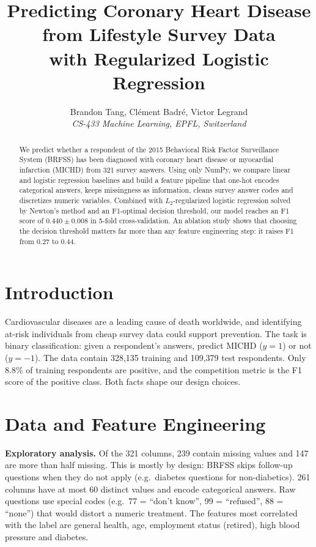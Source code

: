 \documentclass[10pt,conference,compsocconf]{IEEEtran}
\begin{document}
\title{Predicting Coronary Heart Disease from Lifestyle Survey Data\\with Regularized Logistic Regression}

\author{
  Brandon Tang, Cl\'ement Badr\'e, Victor Legrand\\
  \textit{CS-433 Machine Learning, EPFL, Switzerland}
}

\maketitle

\begin{abstract}
We predict whether a respondent of the 2015 Behavioral Risk Factor
Surveillance System (BRFSS) has been diagnosed with coronary heart disease or
myocardial infarction (MICHD) from 321 survey answers. Using only NumPy, we
compare linear and logistic regression baselines and build a feature pipeline
that one-hot encodes categorical answers, keeps missingness as information,
cleans survey answer codes and discretizes numeric variables. Combined with
$L_2$-regularized logistic regression solved by Newton's method and an
F1-optimal decision threshold, our model reaches an F1 score of
$0.440\pm0.008$ in 5-fold cross-validation. An ablation study shows that
choosing the decision threshold matters far more than any feature
engineering step: it raises F1 from 0.27 to 0.44.
\end{abstract}

\section{Introduction}
Cardiovascular diseases are a leading cause of death worldwide, and
identifying at-risk individuals from cheap survey data could support
prevention. The task is binary classification: given a respondent's answers,
predict MICHD ($y=1$) or not ($y=-1$). The data contain 328{,}135 training and
109{,}379 test respondents. Only 8.8\% of training respondents are positive,
and the competition metric is the F1 score of the positive class. Both facts
shape our design choices.

\section{Data and Feature Engineering}
\label{sec:features}
\textbf{Exploratory analysis.} Of the 321 columns, 239 contain missing values
and 147 are more than half missing. This is mostly by design: BRFSS skips
follow-up questions when they do not apply (e.g.\ diabetes questions for
non-diabetics). 261 columns have at most 60 distinct values and encode
categorical answers. Raw questions use special codes (e.g.\ 77 = ``don't
know'', 99 = ``refused'', 88 = ``none'') that would distort a numeric
treatment. The features most correlated with the label are general health,
age, employment status (retired), high blood pressure and diabetes.
\end{document}

